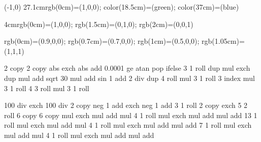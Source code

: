 \newpage


\begin{textblock}{65}(-1,0)
{27.1cm}{rgb(0cm)=(1,0,0); color(18.5cm)=(green); color(37cm)=(blue)}
\end{textblock}
\mbox{}

\newpage

{4cm}{rgb(0cm)=(1,0,0); rgb(1.5cm)=(0,1,0); rgb(2cm)=(0,0,1)}

%
{rgb(0cm)=(0.9,0,0);
rgb(0.7cm)=(0.7,0,0);
rgb(1cm)=(0.5,0,0);
rgb(1.05cm)=(1,1,1)}


{\pgfpoint{1cm}{1cm}}{}{
2 copy %
2 copy abs exch abs add 0.0001 ge { atan } { pop } ifelse
3 1 roll
dup mul exch
dup mul add sqrt
30 mul
add
sin
1 add 2 div
dup
 4 roll %
mul
3 1 roll
3 index
mul
3 1 roll
4 3 roll
mul
3 1 roll
}
%
%
%

%
{\pgfpointorigin}{\pgfpoint{100bp}{100bp}}
{
}{
100 div exch 100 div 2 copy %
neg 1 add exch neg 1 add %
3 1 roll 2 copy exch 5 2 roll 6 copy 6 copy %
\firstred mul exch \secondred mul add mul %
4 1 roll
\thirdred mul exch \fourthred mul add mul
add
13 1 roll
\firstgreen mul exch \secondgreen mul add mul %
4 1 roll
\thirdgreen mul exch \fourthgreen mul add mul
add
7 1 roll
\firstblue mul exch \secondblue mul add mul %
4 1 roll
\thirdblue mul exch \fourthblue mul add mul
add
}


